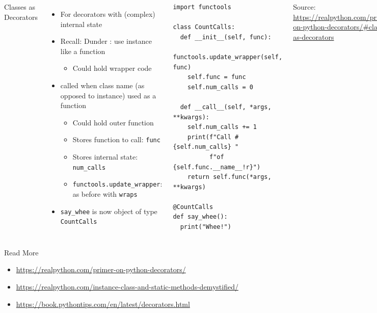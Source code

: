 \begin{frame}[fragile]
%
\begin{columns}[T]
\begin{Large}
	{Classes as Decorators}
	\vspace{12pt}
\end{Large}
%
\begin{itemize}
\item For decorators with (complex) internal state
\item Recall: Dunder : use instance like a function
	\begin{itemize}
	\item Could hold wrapper code
	\end{itemize}
\item {} called when class name (as opposed to instance) used as a function
	\begin{itemize}
	\item Could hold outer function
	\item Stores function to call: \texttt{func}
	\item Stores internal state: \texttt{num\_calls}
	\item \texttt{functools.update\_wrapper}: as before with \texttt{wraps}
	\end{itemize}
\item \texttt{say\_whee} is now object of type \texttt{CountCalls}
\end{itemize}
%
%
\begin{codebox}
\begin{verbatim}
import functools

class CountCalls:
  def __init__(self, func):
    functools.update_wrapper(self, func)
    self.func = func
    self.num_calls = 0

  def __call__(self, *args, **kwargs):
    self.num_calls += 1
    print(f"Call #{self.num_calls} "
          f"of {self.func.__name__!r}")
    return self.func(*args, **kwargs)

@CountCalls
def say_whee():
  print("Whee!")
\end{verbatim}
\end{codebox}
\scriptsize
Source:
 \url{https://realpython.com/primer-on-python-decorators/#classes-as-decorators}
\end{columns}
%
\end{frame}


\begin{frame}{Read More}
%
\begin{itemize}
\item \url{https://realpython.com/primer-on-python-decorators/}
\item \url{https://realpython.com/instance-class-and-static-methods-demystified/}
\item \url{https://book.pythontips.com/en/latest/decorators.html}
\end{itemize}
%
\end{frame}


